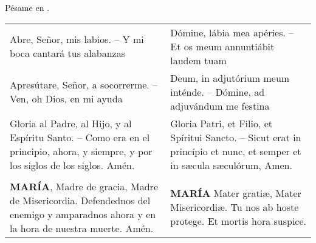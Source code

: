 \documentclass[./rosary.tex]{subfiles}
\begin{document}
\smallskip
Pésame en .
\smallskip

\begin{longtable} {p{} p{} }
    Abre, Señor, mis labios. -- Y mi boca cantará tus alabanzas                                                           
    
     & 
    
    Dómine, lábia mea apéries. -- Et os meum annuntiábit laudem tuam\\
    Apresútare, Señor, a socorrerme. -- Ven, oh Dios, en mi ayuda                                                    
    
     & 
    
    Deum, in adjutórium meum inténde. -- Dómine, ad adjuvándum me festina\\
    \label{sec:glory}Gloria al Padre, al Hijo, y al Espíritu Santo. -- Como era en el principio, ahora, y siempre, y por los siglos de los siglos. Amén.                   
    
     & 
    
    Gloria Patri, et Filio, et Spíritui Sancto. -- Sicut erat in princípio et nunc, et semper et in sæcula sæculórum, Amen. \\\\
    \textbf{MARÍA}, Madre de gracia, Madre de Misericordia. Defendednos del enemigo y amparadnos ahora y en la hora de nuestra muerte. Amén.                               
    
     & 
    
    \textbf{MARÍA} Mater gratiæ, Mater Misericordiæ. Tu nos ab hoste protege. Et mortis hora suspice.

\end{longtable}
\end{document}
